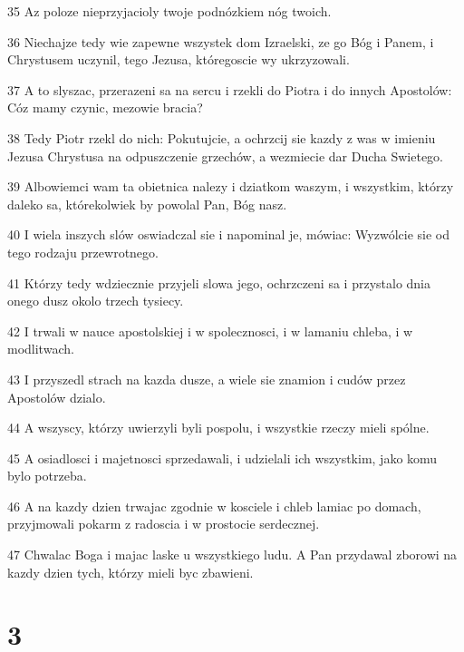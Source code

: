 \par 35 Az poloze nieprzyjacioly twoje podnózkiem nóg twoich.
\par 36 Niechajze tedy wie zapewne wszystek dom Izraelski, ze go Bóg i Panem, i Chrystusem uczynil, tego Jezusa, któregoscie wy ukrzyzowali.
\par 37 A to slyszac, przerazeni sa na sercu i rzekli do Piotra i do innych Apostolów: Cóz mamy czynic, mezowie bracia?
\par 38 Tedy Piotr rzekl do nich: Pokutujcie, a ochrzcij sie kazdy z was w imieniu Jezusa Chrystusa na odpuszczenie grzechów, a wezmiecie dar Ducha Swietego.
\par 39 Albowiemci wam ta obietnica nalezy i dziatkom waszym, i wszystkim, którzy daleko sa, którekolwiek by powolal Pan, Bóg nasz.
\par 40 I wiela inszych slów oswiadczal sie i napominal je, mówiac: Wyzwólcie sie od tego rodzaju przewrotnego.
\par 41 Którzy tedy wdziecznie przyjeli slowa jego, ochrzczeni sa i przystalo dnia onego dusz okolo trzech tysiecy.
\par 42 I trwali w nauce apostolskiej i w spolecznosci, i w lamaniu chleba, i w modlitwach.
\par 43 I przyszedl strach na kazda dusze, a wiele sie znamion i cudów przez Apostolów dzialo.
\par 44 A wszyscy, którzy uwierzyli byli pospolu, i wszystkie rzeczy mieli spólne.
\par 45 A osiadlosci i majetnosci sprzedawali, i udzielali ich wszystkim, jako komu bylo potrzeba.
\par 46 A na kazdy dzien trwajac zgodnie w kosciele i chleb lamiac po domach, przyjmowali pokarm z radoscia i w prostocie serdecznej.
\par 47 Chwalac Boga i majac laske u wszystkiego ludu. A Pan przydawal zborowi na kazdy dzien tych, którzy mieli byc zbawieni.

\chapter{3}

